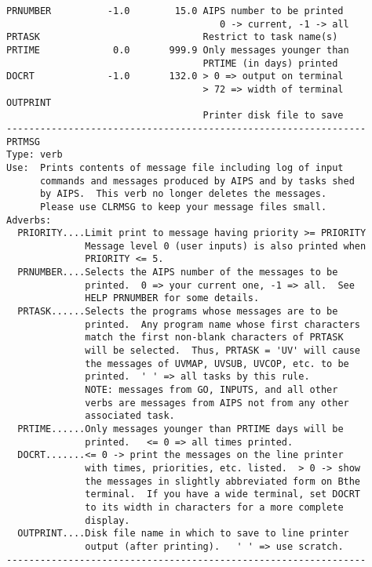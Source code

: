 \begin{verbatim}
PRNUMBER          -1.0        15.0 AIPS number to be printed
                                      0 -> current, -1 -> all
PRTASK                             Restrict to task name(s)
PRTIME             0.0       999.9 Only messages younger than
                                   PRTIME (in days) printed
DOCRT             -1.0       132.0 > 0 => output on terminal
                                   > 72 => width of terminal
OUTPRINT
                                   Printer disk file to save
----------------------------------------------------------------
PRTMSG
Type: verb
Use:  Prints contents of message file including log of input
      commands and messages produced by AIPS and by tasks shed
      by AIPS.  This verb no longer deletes the messages.
      Please use CLRMSG to keep your message files small.
Adverbs:
  PRIORITY....Limit print to message having priority >= PRIORITY
              Message level 0 (user inputs) is also printed when
              PRIORITY <= 5.
  PRNUMBER....Selects the AIPS number of the messages to be
              printed.  0 => your current one, -1 => all.  See
              HELP PRNUMBER for some details.
  PRTASK......Selects the programs whose messages are to be
              printed.  Any program name whose first characters
              match the first non-blank characters of PRTASK
              will be selected.  Thus, PRTASK = 'UV' will cause
              the messages of UVMAP, UVSUB, UVCOP, etc. to be
              printed.  ' ' => all tasks by this rule.
              NOTE: messages from GO, INPUTS, and all other
              verbs are messages from AIPS not from any other
              associated task.
  PRTIME......Only messages younger than PRTIME days will be
              printed.   <= 0 => all times printed.
  DOCRT.......<= 0 -> print the messages on the line printer
              with times, priorities, etc. listed.  > 0 -> show
              the messages in slightly abbreviated form on Bthe
              terminal.  If you have a wide terminal, set DOCRT
              to its width in characters for a more complete
              display.
  OUTPRINT....Disk file name in which to save to line printer
              output (after printing).   ' ' => use scratch.
----------------------------------------------------------------
\end{verbatim}

